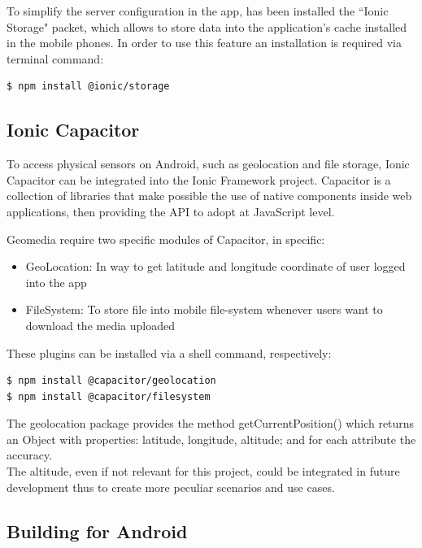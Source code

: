\documentclass[conference]{IEEEtran}
\begin{document}
To simplify the server configuration in the app, has been installed the ``Ionic Storage" \cite{b9} packet, which allows to store data into the application's cache installed in the mobile phones. In order to use this feature an installation is required via terminal command: 
\begin{lstlisting}[language=Sh]
$ npm install @ionic/storage
\end{lstlisting}



\subsection{Ionic Capacitor}

To access physical sensors on Android, such as geolocation and file storage, Ionic Capacitor\cite{b10} can be integrated into the Ionic Framework project. Capacitor is a collection of libraries that make possible the use of native components inside web applications, then providing the API to adopt at JavaScript level.

Geomedia require two specific modules of Capacitor, in specific:
\begin{itemize}
    \item GeoLocation\cite{b2}: In way to get latitude and longitude coordinate of user logged into the app
    \item FileSystem\cite{b3}: To store file into mobile file-system whenever users want to download the media uploaded
\end{itemize}

These plugins can be installed via a shell command, respectively:
\begin{lstlisting}[language=Sh]
$ npm install @capacitor/geolocation
$ npm install @capacitor/filesystem
\end{lstlisting}

The geolocation package provides the method getCurrentPosition() which returns an Object with properties: latitude, longitude, altitude; and for each attribute the accuracy.
\\
The altitude, even if not relevant for this project, could be integrated in future development thus to create more peculiar scenarios and use cases.


\subsection{Building for Android}
\end{document}
